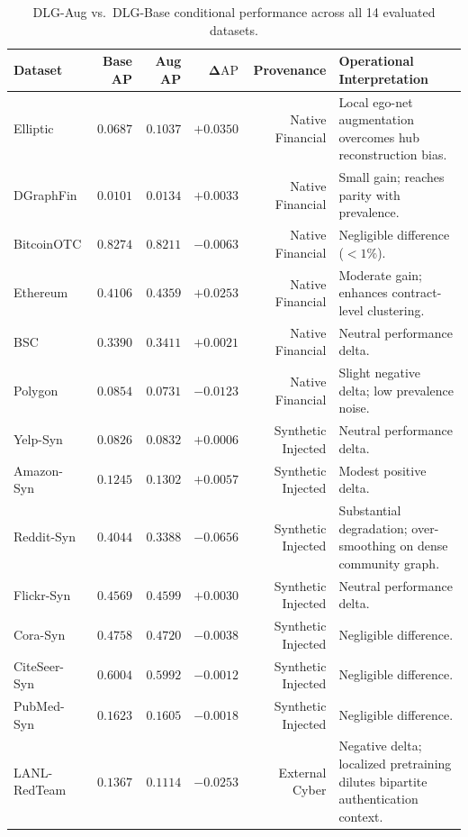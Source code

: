 \documentclass[11pt,a4paper]{article}
\begin{document}
\begin{table}[htbp]
\centering\small
\caption{DLG-Aug vs.\ DLG-Base conditional performance across all 14 evaluated datasets.}
\label{tab:conditional_delta}
\begin{tabularx}{\textwidth}{lrrrrX}\toprule
\textbf{Dataset} & \textbf{Base AP} & \textbf{Aug AP} & $\mathbf{\Delta\mathrm{AP}}$ & \textbf{Provenance} & \textbf{Operational Interpretation} \\\midrule
Elliptic & $0.0687$ & $0.1037$ & $\mathbf{+0.0350}$ & Native Financial & Local ego-net augmentation overcomes hub reconstruction bias. \\
DGraphFin & $0.0101$ & $0.0134$ & $+0.0033$ & Native Financial & Small gain; reaches parity with prevalence. \\
BitcoinOTC & $0.8274$ & $0.8211$ & $-0.0063$ & Native Financial & Negligible difference ($<1\%$). \\
Ethereum & $0.4106$ & $0.4359$ & $\mathbf{+0.0253}$ & Native Financial & Moderate gain; enhances contract-level clustering. \\
BSC & $0.3390$ & $0.3411$ & $+0.0021$ & Native Financial & Neutral performance delta. \\
Polygon & $0.0854$ & $0.0731$ & $-0.0123$ & Native Financial & Slight negative delta; low prevalence noise. \\
Yelp-Syn & $0.0826$ & $0.0832$ & $+0.0006$ & Synthetic Injected & Neutral performance delta. \\
Amazon-Syn & $0.1245$ & $0.1302$ & $+0.0057$ & Synthetic Injected & Modest positive delta. \\
Reddit-Syn & $0.4044$ & $0.3388$ & $\mathbf{-0.0656}$ & Synthetic Injected & Substantial degradation; over-smoothing on dense community graph. \\
Flickr-Syn & $0.4569$ & $0.4599$ & $+0.0030$ & Synthetic Injected & Neutral performance delta. \\
Cora-Syn & $0.4758$ & $0.4720$ & $-0.0038$ & Synthetic Injected & Negligible difference. \\
CiteSeer-Syn & $0.6004$ & $0.5992$ & $-0.0012$ & Synthetic Injected & Negligible difference. \\
PubMed-Syn & $0.1623$ & $0.1605$ & $-0.0018$ & Synthetic Injected & Negligible difference. \\\midrule
LANL-RedTeam & $0.1367$ & $0.1114$ & $\mathbf{-0.0253}$ & External Cyber & Negative delta; localized pretraining dilutes bipartite authentication context. \\\bottomrule
\end{tabularx}
\end{table}
\end{document}
